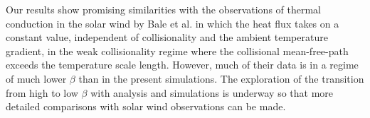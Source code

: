 \documentclass[%
 reprint,
superscriptaddress,
 amsmath,amssymb,
 aps,
]{revtex4-1}
\begin{document}
Our results show promising similarities with the observations of
thermal conduction in the solar wind by Bale et al. \cite{Bale2013} in
which the heat flux takes on a constant value, independent of
collisionality and the ambient temperature gradient, in the weak
collisionality regime where the collisional mean-free-path exceeds the
temperature scale length. However, much of their data is in a regime
of much lower $\beta$ than in the present simulations. The exploration
of the transition from high to low $\beta$ with analysis and
simulations is underway so that more detailed comparisons with solar
wind observations can be made.



\end{document}
